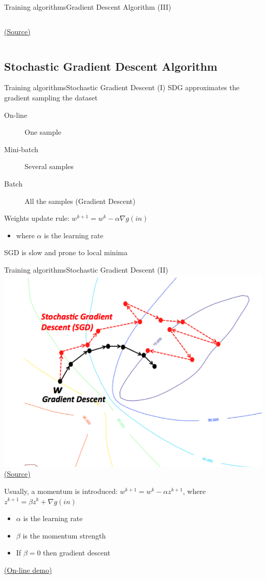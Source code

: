 \documentclass[10pt,compress]{beamer} %
\begin{document}
\begin{frame}{Training algorithms}{Gradient Descent Algorithm (III)}
\begin{columns}
\begin{center}
	\scriptsize \href{http://www.turingfinance.com/misconceptions-about-neural-networks/}{(Source)}
	\end{center}
	\end{columns}
\end{frame}

\subsection{Stochastic Gradient Descent Algorithm}
\begin{frame}{Training algorithms}{Stochastic Gradient Descent (I)}
	SDG approximates the gradient sampling the dataset
		\begin{description}
			\item[On-line] One sample
			\item[Mini-batch] Several samples
			\item[Batch] All the samples (Gradient Descent)
		\end{description}
	Weights update rule: $w^{k+1} = w^k - \alpha \nabla g(in)$
		\begin{itemize}
			\item where $\alpha$ is the learning rate
		\end{itemize}
    SGD is slow and prone to local minima
	\end{frame}

\begin{frame}{Training algorithms}{Stochastic Gradient Descent (II)}
	\centering
	\includegraphics[width=0.5\linewidth]{figs/sdg.png}\\
	\scriptsize \href{https://wikidocs.net/3413}{(Source)}

	\begin{flushleft}
	Usually, a \alert{momentum} is introduced: $w^{k+1} = w^k - \alpha z^{k+1}$, where $z^{k+1} = \beta z^k + \nabla g(in)$
		\begin{itemize}
			\item $\alpha$ is the learning rate
			\item $\beta$ is the momentum strength
            \item If $\beta = 0$ then gradient descent
		\end{itemize}
	\end{flushleft}

    \href{http://distill.pub/2017/momentum/}{(On-line demo)}
\end{frame}
\end{document}
